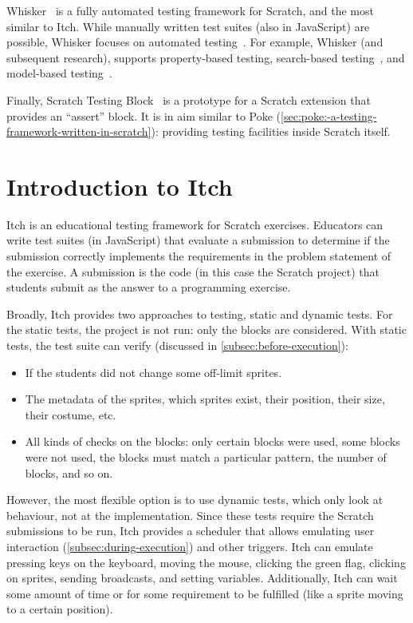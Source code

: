 \documentclass[../main]{subfiles}
\begin{document}
Whisker~\autocite{stahlbauerTestingScratchPrograms2019} is a fully automated testing framework for Scratch, and the most similar to Itch.
While manually written test suites (also in JavaScript) are possible, Whisker focuses on automated testing~\autocite{deinerAutomatedTestGeneration2023}.
For example, Whisker (and subsequent research), supports property-based testing, search-based testing~\autocite{deinerSearchBasedTestingScratch2020}, and model-based testing~\autocite{gotzModelbasedTestingScratch2022}.

Finally, Scratch Testing Block~\autocite{nurueTestingExtensionScratch2024} is a prototype for a Scratch extension that provides an ``assert'' block.
It is in aim similar to Poke (\cref{sec:poke:-a-testing-framework-written-in-scratch}): providing testing facilities inside Scratch itself.

\section{Introduction to Itch}\label{sec:introduction-to-itch}

Itch is an educational testing framework for Scratch exercises.
Educators can write test suites (in JavaScript) that evaluate a submission to determine if the submission correctly implements the requirements in the problem statement of the exercise.
A submission is the code (in this case the Scratch project) that students submit as the answer to a programming exercise.

Broadly, Itch provides two approaches to testing, static and dynamic tests.
For the static tests, the project is not run: only the blocks are considered.
With static tests, the test suite can verify (discussed in \cref{subsec:before-execution}):

\begin{itemize}[noitemsep]
    \item If the students did not change some off-limit sprites.
    \item The metadata of the sprites, which sprites exist, their position, their size, their costume, etc.
    \item All kinds of checks on the blocks: only certain blocks were used, some blocks were not used, the blocks must match a particular pattern, the number of blocks, and so on.
\end{itemize}

However, the most flexible option is to use dynamic tests, which only look at behaviour, not at the implementation.
Since these tests require the Scratch submissions to be run, Itch provides a scheduler that allows emulating user interaction (\cref{subsec:during-execution}) and other triggers.
Itch can emulate pressing keys on the keyboard, moving the mouse, clicking the green flag, clicking on sprites, sending broadcasts, and setting variables.
Additionally, Itch can wait some amount of time or for some requirement to be fulfilled (like a sprite moving to a certain position).
\end{document}

